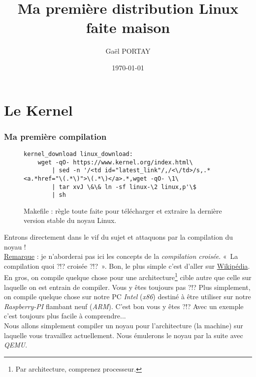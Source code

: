 \documentclass[a4paper]{article}
\title{Ma première distribution Linux faite maison}
\author{Gaël PORTAY}
\date{\today}
\begin{document}
\sloppy
\maketitle

\begin{abstract}
\end{abstract}

\clearpage
\tableofcontents

\clearpage
\part{Le Kernel}

\section{Ma première compilation}

\begin{figure}
\label{makefile:linux_download}
\lstset{language=make,numbers=left,tabsize=2}
\begin{lstlisting}
kernel_download linux_download:
	wget -qO- https://www.kernel.org/index.html\
		| sed -n '/<td id="latest_link"/,/<\/td>/s,.*<a.*href="\(.*\)">\(.*\)</a>.*,wget -qO- \1\
		| tar xvJ \&\& ln -sf linux-\2 linux,p'\$
		| sh
\end{lstlisting}
\caption{Makefile : règle toute faite pour télécharger et extraire la dernière version stable du noyau Linux.}
\end{figure}

Entrons directement dans le vif du sujet et attaquons par la compilation du noyau !\\

\underline{Remarque} : je n'aborderai pas ici les concepts de la \textit{compilation croisée}. «~La compilation quoi ?!? croisée ?!?~». Bon, le plus simple c'est d'aller sur \href{https://fr.wikipedia.org/wiki/Compilateur#Compilation_crois.C3.A9e}{Wikipédia}. En gros, on compile quelque chose pour une architecture\footnote{Par architecture, comprenez processeur.}  cible autre que celle sur laquelle on est entrain de compiler. Vous y êtes toujours pas ?!? Plus simplement, on compile quelque chose sur notre PC \textit{Intel} (\textit{x86}) destiné à être utiliser sur notre \textit{Raspberry-PI} flambant neuf (\textit{ARM}). C'est bon vous y êtes ?!? Avec un exemple c'est toujours plus facile à comprendre...\\

Nous allons simplement compiler un noyau pour l'architecture (la machine) sur laquelle vous travaillez actuellement. Nous émulerons le noyau par la suite avec \textit{QEMU}.\\
\end{document}
